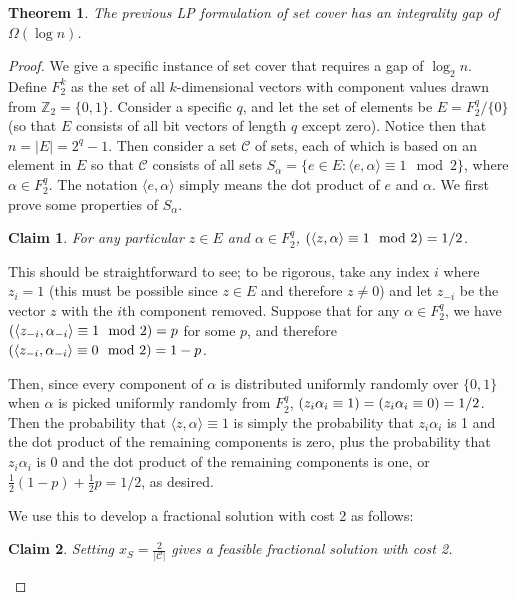 \documentclass[11pt]{article}
\let\Pr\relax
\DeclareMathOperator*{\Pr}{\mathbb{P}}
\newtheorem{theorem}{Theorem}[section]
\newtheorem{claim}{Claim}[theorem]
\newcommand{\C}{\mathcal{C}}
\begin{document}
\begin{shaded}\begin{theorem}
The previous LP formulation of set cover has an integrality gap of $\Omega(\log n)$.
\end{theorem}\end{shaded}
\begin{proof}
We give a specific instance of set cover that requires a gap of $\log_2 n$.  Define $F_2^k$ as the set of all $k$-dimensional vectors with component values drawn from $\mathbb{Z}_2 = \{0, 1\}$.  Consider a specific $q$, and let the set of elements be $E = F_2^q / \{ 0 \}$ (so that $E$ consists of all bit vectors of length $q$ except zero).  Notice then that $n = |E| = 2^q - 1$.  Then consider a set $\C$ of sets, each of which is based on an element in $E$ so that $\C$ consists of all sets $S_\alpha =  \{e \in E: \langle e, \alpha \rangle \equiv 1 \mod 2\}$, where $\alpha \in F_2^q$.  The notation $\langle e, \alpha \rangle$ simply means the dot product of $e$ and $\alpha$.  We first prove some properties of $S_\alpha$.

\begin{framed}\begin{claim}
For any particular $z \in E$ and $\alpha \in F_2^q$, $\Pr(\langle z, \alpha \rangle \equiv 1 \mod 2) = 1/2$.
\end{claim}\end{framed}

This should be straightforward to see; to be rigorous, take any index $i$ where $z_i = 1$ (this must be possible since $z \in E$ and therefore $z \neq 0$) and let $z_{-i}$ be the vector $z$ with the $i$th component removed.  Suppose that for any $\alpha \in F_2^q$, we have $\Pr(\langle z_{-i}, \alpha_{-i} \rangle \equiv 1 \mod 2) = p$ for some $p$, and therefore $\Pr(\langle z_{-i}, \alpha_{-i} \rangle \equiv 0 \mod 2) = 1-p$.  

Then, since every component of $\alpha$ is distributed uniformly randomly over $\{0, 1\}$ when $\alpha$ is picked uniformly randomly from $F_2^q$, $\Pr(z_i \alpha_i \equiv 1) = \Pr(z_i \alpha_i \equiv 0) = 1/2$.  Then the probability that $\langle z, \alpha \rangle \equiv 1$ is simply the probability that $z_i \alpha_i$ is 1 and the dot product of the remaining components is zero, plus the probability that $z_i \alpha_i$ is 0 and the dot product of the remaining components is one, or $\frac{1}{2}(1-p) + \frac{1}{2}p = 1/2$, as desired.

We use this to develop a fractional solution with cost 2 as follows:
\begin{framed}\begin{claim}
Setting $x_S = \frac{2}{|\C|}$ gives a feasible fractional solution with cost 2.
\end{claim}\end{framed}


\end{proof}
\end{document}
